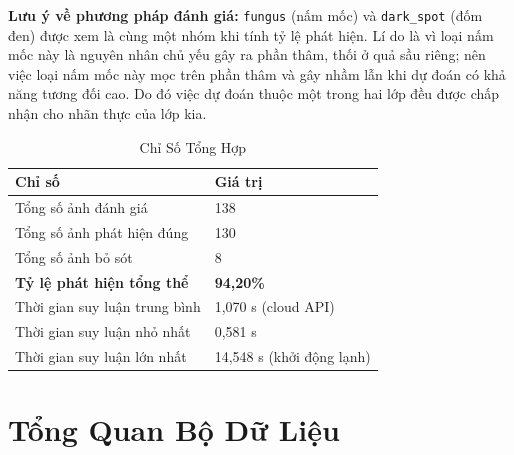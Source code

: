 \documentclass[12pt, a4paper]{article}
\begin{document}
\begin{tcolorbox}[notebox]
\textbf{Lưu ý về phương pháp đánh giá:} \texttt{fungus} (nấm mốc) và \texttt{dark\_spot} (đốm đen) được xem là cùng một nhóm khi tính tỷ lệ phát hiện. Lí do là vì loại nấm mốc này là nguyên nhân chủ yếu gây ra phần thâm, thối ở quả sầu riêng; nên việc loại nấm mốc này mọc trên phần thâm và gây nhầm lẫn khi dự đoán có khả năng tương đối cao. Do đó việc dự đoán thuộc một trong hai lớp đều được chấp nhận cho nhãn thực của lớp kia.
\end{tcolorbox}

\vspace{6pt}

\begin{table}[H]
  \centering
  \caption{Chỉ Số Tổng Hợp}
  \begin{tabularx}{\linewidth}{L{6cm} C{4cm}}
    \toprule
    \textbf{Chỉ số} & \textbf{Giá trị} \\
    \midrule
    Tổng số ảnh đánh giá        & 138 \\
    Tổng số ảnh phát hiện đúng  & 130 \\
    Tổng số ảnh bỏ sót          & 8 \\
    \textbf{Tỷ lệ phát hiện tổng thể} & \textbf{94,20\%} \\
    Thời gian suy luận trung bình & 1,070 s (cloud API) \\
    Thời gian suy luận nhỏ nhất  & 0,581 s \\
    Thời gian suy luận lớn nhất  & 14,548 s (khởi động lạnh) \\
    \bottomrule
  \end{tabularx}
\end{table}

\section{Tổng Quan Bộ Dữ Liệu}
\end{document}
